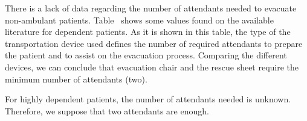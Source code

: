 \documentclass{style/llncs}
\begin{document}
\begin{table}[tbp]
\begin{mdcenter}
\mdhr{}%

\noindent{}%
\end{mdcenter}\label{tab-prep-trans}%
\end{table}%

There is a lack of data regarding the number of attendants needed to
evacuate non-ambulant patients. Table~ shows some
values found on the available literature for dependent patients. As it is
shown in this table, the type of the transportation device used defines
the number of required attendants to prepare the patient and to assist on
the evacuation process. Comparing the different devices, we can conclude
that evacuation chair and the rescue sheet require the minimum number of
attendants (two).%

For highly dependent patients, the number of attendants needed is
unknown. Therefore, we suppose that two attendants are enough.%
\end{document}
